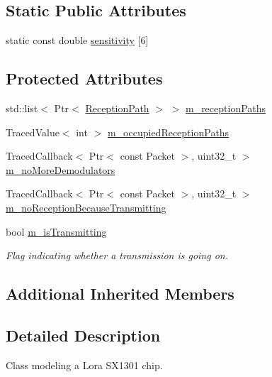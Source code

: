 \subsection*{Static Public Attributes}
\begin{DoxyCompactItemize}
\item 
static const double \hyperlink{classns3_1_1lorawan_1_1GatewayLoraPhy_a5e087b8d88cf37e3c81d189876cb3b67}{sensitivity} \mbox{[}6\mbox{]}
\end{DoxyCompactItemize}
\subsection*{Protected Attributes}
\begin{DoxyCompactItemize}
\item 
std\+::list$<$ Ptr$<$ \hyperlink{classns3_1_1lorawan_1_1GatewayLoraPhy_1_1ReceptionPath}{Reception\+Path} $>$ $>$ \hyperlink{classns3_1_1lorawan_1_1GatewayLoraPhy_ad76f73bdb7fe35f39eaf75cf619445fc}{m\+\_\+reception\+Paths}
\item 
Traced\+Value$<$ int $>$ \hyperlink{classns3_1_1lorawan_1_1GatewayLoraPhy_a4cf88e2deb82b7739dd028c6122e1ad4}{m\+\_\+occupied\+Reception\+Paths}
\item 
Traced\+Callback$<$ Ptr$<$ const Packet $>$, uint32\+\_\+t $>$ \hyperlink{classns3_1_1lorawan_1_1GatewayLoraPhy_ae88528e820900ced7285b7993622cdc5}{m\+\_\+no\+More\+Demodulators}
\item 
Traced\+Callback$<$ Ptr$<$ const Packet $>$, uint32\+\_\+t $>$ \hyperlink{classns3_1_1lorawan_1_1GatewayLoraPhy_a69dbd2dafaea10f75115f2eb38ae06dd}{m\+\_\+no\+Reception\+Because\+Transmitting}
\item 
\mbox{\label{classns3_1_1lorawan_1_1GatewayLoraPhy_a0eb1bd0116270a374e1ebdf461da7c22}} 
bool \hyperlink{classns3_1_1lorawan_1_1GatewayLoraPhy_a0eb1bd0116270a374e1ebdf461da7c22}{m\+\_\+is\+Transmitting}
\begin{DoxyCompactList}\small\item\em Flag indicating whether a transmission is going on. \end{DoxyCompactList}\end{DoxyCompactItemize}
\subsection*{Additional Inherited Members}


\subsection{Detailed Description}
Class modeling a Lora S\+X1301 chip.

